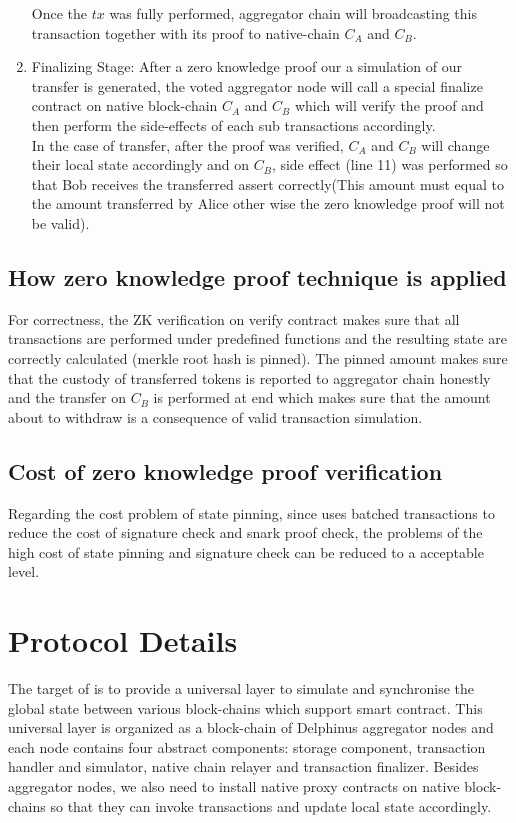 \documentclass[acmtog, natbib=false]{acmart}
\begin{document}
\begin{enumerate}[leftmargin=*]
\newline
Once the $tx$ was fully performed, aggregator chain will broadcasting this transaction together with its proof to native-chain $C_A$ and $C_B$.\\
\item Finalizing Stage:
After a zero knowledge proof our a simulation of our transfer is generated, the voted aggregator node will call a special finalize contract on native block-chain $C_A$ and $C_B$ which will verify the proof and then perform the side-effects of each sub transactions accordingly.\\
\newline
In the case of transfer, after the proof was verified, $C_A$ and $C_B$ will change their local state accordingly and on $C_B$, side effect (line 11) was performed so that Bob receives the transferred assert correctly(This amount must equal to the amount transferred by Alice other wise the zero knowledge proof will not be valid).
\end{enumerate}
\subsection{How zero knowledge proof technique is applied}
For correctness, the ZK verification on verify contract makes sure that all transactions are performed under predefined functions and the resulting state are correctly calculated (merkle root hash is pinned). The pinned amount makes sure that the custody of transferred tokens is reported to aggregator chain honestly and the transfer on $C_B$ is performed at end which makes sure that the amount about to withdraw is a consequence of valid transaction simulation.

\subsection{Cost of zero knowledge proof verification}
Regarding the cost problem of state pinning, since \dprotocol uses batched transactions to reduce the cost of signature check and snark proof check, the problems of the high cost of state pinning and signature check can be reduced to a acceptable level.

\section{Protocol Details}
The target of \dprotocol is to provide a universal layer to simulate and synchronise the global state between various block-chains which support smart contract. This universal layer is organized as a block-chain of Delphinus aggregator nodes and each node contains four abstract components: storage component, transaction handler and simulator, native chain relayer and transaction finalizer.  Besides aggregator nodes, we also need to install native proxy contracts on native block-chains so that they can invoke transactions and update local state accordingly.
\end{document}
